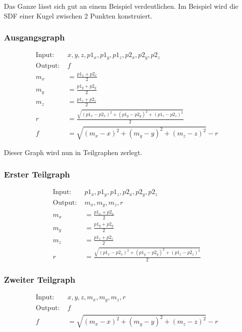 \documentclass[
	ngerman,%
	accentcolor=9c,%
	ruledheaders=section,%
	class=report,%
	thesis={type=bachelor},%
	fontsize=11pt,%
	parskip=half-,%
	custommargins=true,%
	marginpar=false,%
]{tudapub}
\begin{document}
Das Ganze lässt sich gut an einem Beispiel verdeutlichen. 
Im Beispiel wird die SDF einer Kugel zwischen 2 Punkten konstruiert.


\subsubsection*{Ausgangsgraph}

\begin{align*}
\text{Input: } & x, y, z, p1_x, p1_y, p1_z, p2_x, p2_y, p2_z \\
\text{Output: } & f \\[4pt]
m_x &= \frac{p1_x + p2_x}{2} \\
m_y &= \frac{p1_y + p2_y}{2} \\
m_z &= \frac{p1_z + p2_z}{2} \\
r &= \frac{\sqrt{(p1_x - p2_x)^2 + (p1_y - p2_y)^2 + (p1_z - p2_z)^2}}{2} \\
f &= \sqrt{(m_x - x)^2 + (m_y - y)^2 + (m_z - z)^2} - r
\end{align*}

Dieser Graph wird nun in Teilgraphen zerlegt.

\subsubsection*{Erster Teilgraph}

\begin{align*}
\text{Input: } & p1_x, p1_y, p1_z, p2_x, p2_y, p2_z \\
\text{Output: } & m_x, m_y, m_z, r \\[4pt]
m_x &= \frac{p1_x + p2_x}{2} \\
m_y &= \frac{p1_y + p2_y}{2} \\
m_z &= \frac{p1_z + p2_z}{2} \\
r &= \frac{\sqrt{(p1_x - p2_x)^2 + (p1_y - p2_y)^2 + (p1_z - p2_z)^2}}{2}
\end{align*}

\subsubsection*{Zweiter Teilgraph}

\begin{align*}
\text{Input: } & x, y, z, m_x, m_y, m_z, r \\
\text{Output: } & f \\[4pt]
f &= \sqrt{(m_x - x)^2 + (m_y - y)^2 + (m_z - z)^2} - r
\end{align*}
\end{document}
